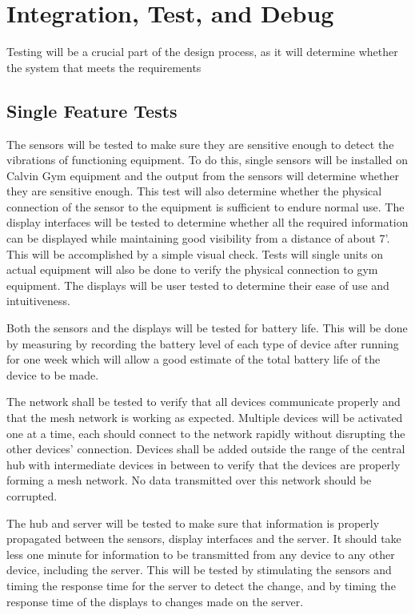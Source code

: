 \documentclass[PPFS.tex]{template/subfiles}
\begin{document}
\section{Integration, Test, and Debug}
Testing will be a crucial part of the design process, as it will determine whether the system that meets the requirements 

\subsection{Single Feature Tests}
The sensors will be tested to make sure they are sensitive enough to detect the vibrations of functioning equipment.  To do this, single sensors will be installed on Calvin Gym equipment and the output from the sensors will determine whether they are sensitive enough. This test will also determine whether the physical connection of the sensor to the equipment is sufficient to endure normal use.
The display interfaces will be tested to determine whether all the required information can be displayed while maintaining good visibility from a distance of about 7'. This will be accomplished by a simple visual check. Tests will single units on actual equipment will also be done to verify the physical connection to gym equipment. The displays will be user tested to determine their ease of use and intuitiveness.

Both the sensors and the displays will be tested for battery life. This will be done by measuring by recording the battery level of each type of device after running for one week which will allow a good estimate of the total battery life of the device to be made.

The network shall be tested to verify that all devices communicate properly and that the mesh network is working as expected. Multiple devices will be activated one at a time, each should connect to the network rapidly without disrupting the other devices’ connection. Devices shall be added outside the range of the central hub with intermediate devices in between to verify that the devices are properly forming a mesh network. No data transmitted over this network should be corrupted.

The hub and server will be tested to make sure that information is properly propagated between the sensors, display interfaces and the server. It should take less one minute for information to be transmitted from any device to any other device, including the server. This will be tested by stimulating the sensors and timing the response time for the server to detect the change, and by timing the response time of the displays to changes made on the server. 
\end{document}
